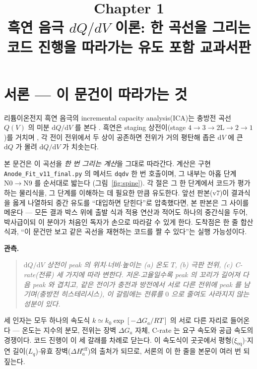 \documentclass[11pt,a4paper]{article}
\title{\textbf{\LARGE Chapter 1}\\[0.35em]\Large 흑연 음극 $dQ/dV$ 이론: 한 곡선을 그리는 코드 진행을 따라가는 유도 포함 교과서판}
\author{}
\date{}
\newcommand{\dd}{\mathrm{d}}
\newcommand{\eff}{\mathrm{eff}}
\newcommand{\eq}{\mathrm{eq}}
\newcommand{\code}[1]{\texttt{#1}}
\begin{document}
\maketitle

\section*{서론 — 이 문건이 따라가는 것}
리튬이온전지 흑연 음극의 incremental capacity analysis(ICA)는 충방전 곡선 $Q(V)$ 의 미분
$\dd Q/\dd V$ 를 본다 \cite{bloom2005,dubarry2012}. 흑연은 staging 상전이(stage
$4\!\to\!3\!\to\!2\mathrm L\!\to\!2\!\to\!1$)를 거치며 \cite{dahn1991,ohzuku1993}, 각 전이 전위에서
두 상이 공존하면 전위가 거의 평탄해 좁은 $\dd V$ 에 큰 $\dd Q$ 가 몰려 $\dd Q/\dd V$ 가 치솟는다.

본 문건은 이 곡선을 \emph{한 번 그리는 계산}을 그대로 따라간다. 계산은 구현 \code{Anode\_Fit\_v11\_final.py}
의 메서드 \code{dqdv} 한 번 호출이며, 그 내부는 아홉 단계 $\mathrm N0\!\to\!\mathrm N9$ 를 순서대로 밟는다
(그림~\ref{fig:spine}). 각 절은 그 한 단계에서 코드가 평가하는 물리식을, 그 단계를 이해하는 데 필요한 만큼
유도한다. 앞선 판본(v7)이 결과식을 옳게 나열하되 중간 유도를 ``대입하면 닫힌다''로 압축했다면, 본 판본은
그 사이를 메운다 — 모든 결과 박스 위에 출발 식과 적용 연산과 적어도 하나의 중간식을 두어, 박사급이되 이
분야가 처음인 독자가 손으로 따라갈 수 있게 한다. 도착점은 한 줄 합산식과, ``이 문건만 보고 같은 곡선을
재현하는 코드를 짤 수 있다''는 실행 가능성이다.

\textbf{관측.}
\begin{quote}\itshape
$\dd Q/\dd V$ 상전이 peak 의 위치$\cdot$너비$\cdot$높이는 (a) 온도 $T$, (b) 극판 전위, (c) C-rate(전류)
세 가지에 따라 변한다. 저온$\cdot$고율일수록 peak 의 꼬리가 길어져 다음 peak 와 겹치고, 같은 전이가 충전과 방전에서
서로 다른 전위에 peak 를 남기며(충방전 히스테리시스), 이 갈림에는 전류를 $0$ 으로 줄여도 사라지지 않는 성분이 있다.
\end{quote}

세 인자는 모두 하나의 속도식 $k\simeq k_0\exp[-\Delta G_a/RT]$ 의 서로 다른 자리로 들어온다 — 온도는 지수의 분모,
전위는 장벽 $\Delta G_a$ 자체, C-rate 는 요구 속도와 공급 속도의 경쟁이다. 코드 진행이 이 세 갈래를 차례로 닫는다.
이 속도식이 곳곳에서 평형($\xi_\eq$)$\cdot$지연 길이($L_q$)$\cdot$유효 장벽($\Delta H_a^\eff$)의 출처가 되므로,
서론의 이 한 줄을 본문이 여러 번 되짚는다.
\end{document}
